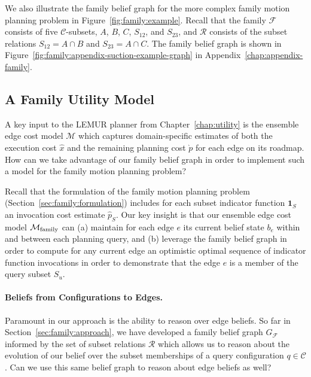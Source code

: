 We also illustrate the family belief graph
for the more complex family motion planning
problem in Figure~\ref{fig:family:example}.
Recall that the family $\mathcal{F}$ consists of
five $\mathcal{C}$-subsets, $A$, $B$, $C$, $S_{12}$, and $S_{23}$,
and $\mathcal{R}$ consists of the subset relations
$S_{12} = A \cap B$ and $S_{23} = A \cap C$.
The family belief graph is shown
in Figure~\ref{fig:family:appendix-suction-example-graph}
in Appendix~\ref{chap:appendix-family}.

\subsection{A Family Utility Model}

A key input to the LEMUR planner from Chapter~\ref{chap:utility}
is the ensemble edge cost model $\mathcal{M}$
which captures domain-specific estimates of both the
execution cost $\hat{x}$ and the remaining planning cost $\grave{p}$
for each edge on its roadmap.
How can we take advantage of our family belief graph
in order to implement such a model for the family
motion planning problem?

Recall that the formulation of the family motion planning problem
(Section~\ref{sec:family:formulation})
includes for each subset indicator function $\mathbf{1}_S$
an invocation cost estimate $\hat{p}_S$.
Our key insight is that our ensemble edge cost model
$\mathcal{M}_{\mbox{\scriptsize family}}$ can
(a) maintain for each edge $e$ its current belief state $b_e$
within and between each planning query,
and (b) leverage the family belief graph
in order to compute for any current edge 
an optimistic optimal sequence of indicator function invocations
in order to demonstrate that the edge $e$ is a member of the
query subset $S_u$.

\paragraph{Beliefs from Configurations to Edges.}
Paramount in our approach is the ability to reason over edge beliefs.
So far in Section~\ref{sec:family:approach},
we have developed a family belief graph $G_{\mathcal{F}}$
informed by the set of subset relations $\mathcal{R}$
which allows us to reason about the evolution of our belief
over the subset memberships of a query configuration $q \in \mathcal{C}$.
Can we use this same belief graph to reason about edge beliefs as well?

